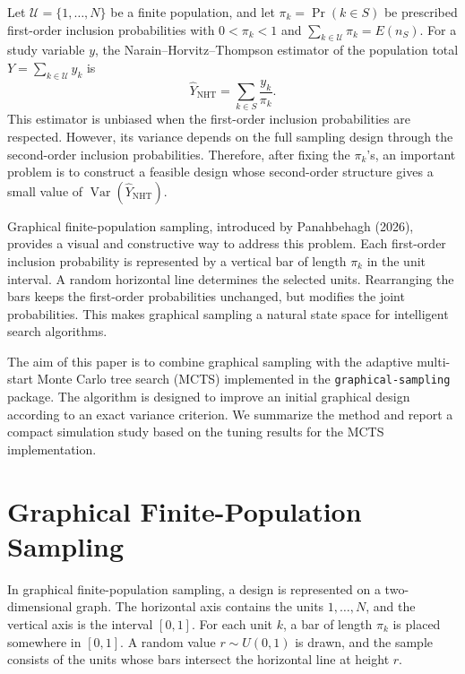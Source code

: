 \documentclass[twoside]{article}
\newcommand{\U}{\mathcal{U}}
\newcommand{\Sample}{S}
\newcommand{\NHT}{\mathrm{NHT}}
\newcommand{\Var}{\operatorname{Var}}
\newcommand{\pr}{\operatorname{Pr}}
\begin{document}
Let $\U=\{1,\ldots,N\}$ be a finite population, and let
$\pi_k=\pr(k\in \Sample)$ be prescribed first-order inclusion probabilities
with $0<\pi_k<1$ and $\sum_{k\in\U}\pi_k=E(n_{\Sample})$. For a study
variable $y$, the Narain--Horvitz--Thompson estimator of the population total
$Y=\sum_{k\in\U}y_k$ is
\[
    \widehat Y_{\NHT}=\sum_{k\in \Sample}\frac{y_k}{\pi_k}.
\]
This estimator is unbiased when the first-order inclusion probabilities are
respected. However, its variance depends on the full sampling design through
the second-order inclusion probabilities. Therefore, after fixing the
$\pi_k$'s, an important problem is to construct a feasible design whose
second-order structure gives a small value of $\Var(\widehat Y_{\NHT})$.

Graphical finite-population sampling, introduced by Panahbehagh (2026),
provides a visual and constructive way to address this problem. Each
first-order inclusion probability is represented by a vertical bar of length
$\pi_k$ in the unit interval. A random horizontal line determines the selected
units. Rearranging the bars keeps the first-order probabilities unchanged, but
modifies the joint probabilities. This makes graphical sampling a natural
state space for intelligent search algorithms.

The aim of this paper is to combine graphical sampling with the adaptive
multi-start Monte Carlo tree search (MCTS) implemented in the
{\tt graphical-sampling} package. The algorithm is designed to improve an
initial graphical design according to an exact variance criterion. We summarize
the method and report a compact simulation study based on the tuning results
for the MCTS implementation.

\section{Graphical Finite-Population Sampling}

In graphical finite-population sampling, a design is represented on a
two-dimensional graph. The horizontal axis contains the units
$1,\ldots,N$, and the vertical axis is the interval $[0,1]$. For each unit
$k$, a bar of length $\pi_k$ is placed somewhere in $[0,1]$. A random value
$r\sim U(0,1)$ is drawn, and the sample consists of the units whose bars
intersect the horizontal line at height $r$.
\end{document}
